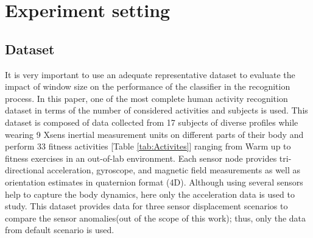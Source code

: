 \section{Experiment setting}

\subsection{Dataset} \label{sec:dataset}
It is very important to use an adequate representative dataset to evaluate the impact of window size on the performance of the classifier in the recognition process. In this paper, one of the most complete human activity recognition dataset \cite{banos2012benchmark} in terms of the number of considered activities and subjects is used. This dataset is composed of data collected from 17 subjects of diverse profiles while wearing 9 Xsens inertial measurement units on different parts of their body and perform 33 fitness activities [Table \ref{tab:Activites}] ranging from Warm up to fitness exercises in an out-of-lab environment. Each sensor node provides tri-directional acceleration, gyroscope, and magnetic field
measurements as well as orientation estimates in quaternion format (4D). Although using several sensors help to capture the body dynamics, here only the acceleration data is used to study. This dataset provides data for three sensor displacement scenarios to compare the sensor anomalies(out of the scope of this work); thus, only the data from default scenario is used.

